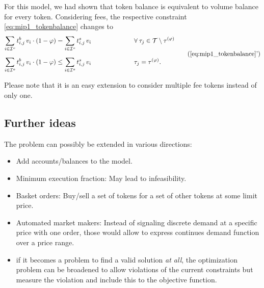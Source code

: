 \documentclass[11pt,parskip=full]{scrartcl}%
\newcommand*{\Min}{\mathrm{min}}
\newcommand*{\tokens}{\mathcal{T}}          %
\newcommand*{\iorders}{\mathcal{I}^o}       %
\begin{document}
For this model, we had shown that token balance is equivalent to volume balance for every token.
Considering fees, the respective constraint \eqref{eq:mip1_tokenbalance} changes to
\begin{equation}
  \begin{aligned}
    \sum\limits_{i \in \iorders} t^b_{i,j} \, v_i \cdot (1-\varphi)
    &= \sum\limits_{i \in \iorders} t^s_{i,j} \, v_i
    &&\hspace{2cm} \forall \> \tau_j \in \tokens \setminus \tau^{(\varphi)} \\[2mm]
    \sum\limits_{i \in \iorders} t^b_{i,j} \, v_i \cdot (1-\varphi)
    &\le \sum\limits_{i \in \iorders} t^s_{i,j} \, v_i
    &&\hspace{2cm} \tau_j = \tau^{(\varphi)}.
  \end{aligned}
  \tag{\ref{eq:mip1_tokenbalance}'}
\end{equation}

Please note that it is an easy extension to consider multiple fee tokens instead of only one.





\newpage
\subsection{Further ideas}

The problem can possibly be extended in various directions:
\begin{itemize}
  \item Add accounts/balances to the model.
  \item Minimum execution fraction: May lead to infeasibility.
  \item Basket orders: Buy/sell a set of tokens for a set of other tokens at some limit price.
  \item Automated market makers: Instead of signaling discrete demand at a specific price with one
  order, those would allow to express continues demand function over a price range.
  \item if it becomes a problem to find a valid solution \emph{at all}, the optimization problem can
  be broadened to allow violations of the current constraints but measure the violation and
  include this to the objective function.
\end{itemize}
\end{document}
